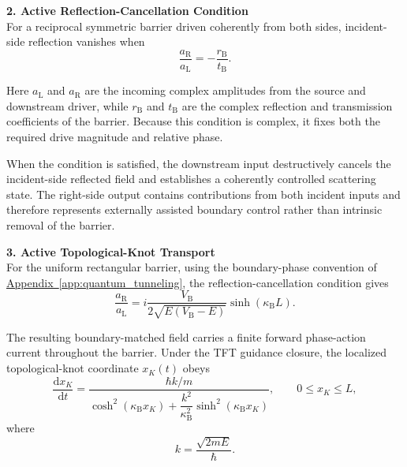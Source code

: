 \vspace{0.5em}
\noindent\textbf{2. Active Reflection-Cancellation Condition} \\

For a reciprocal symmetric barrier driven coherently from both sides, incident-side reflection vanishes when
\begin{equation}
    \frac{a_{\mathrm R}}{a_{\mathrm L}}
    =
    -\frac{r_{\mathrm B}}{t_{\mathrm B}}.
\end{equation}

Here $a_{\mathrm L}$ and $a_{\mathrm R}$ are the incoming complex amplitudes from the source and downstream driver, while $r_{\mathrm B}$ and $t_{\mathrm B}$ are the complex reflection and transmission coefficients of the barrier. Because this condition is complex, it fixes both the required drive magnitude and relative phase.

When the condition is satisfied, the downstream input destructively cancels the incident-side reflected field and establishes a coherently controlled scattering state. The right-side output contains contributions from both incident inputs and therefore represents externally assisted boundary control rather than intrinsic removal of the barrier.

\vspace{0.5em}
\noindent\textbf{3. Active Topological-Knot Transport} \\

For the uniform rectangular barrier, using the boundary-phase convention of
\hyperref[app:quantum_tunneling]{Appendix~\ref*{app:quantum_tunneling}}, the reflection-cancellation condition gives
\begin{equation}
    \frac{a_{\mathrm R}}{a_{\mathrm L}}
    =
    i
    \frac{
        V_{\mathrm B}
    }{
        2\sqrt{
            E(V_{\mathrm B}-E)
        }
    }
    \sinh\!\left(
        \kappa_{\mathrm B}L
    \right).
\end{equation}

The resulting boundary-matched field carries a finite forward phase-action current throughout the barrier. Under the TFT guidance closure, the localized topological-knot coordinate $x_K(t)$ obeys
\begin{equation}
    \frac{\mathrm dx_K}{\mathrm dt}
    =
    \frac{
        \hbar k/m
    }{
        \cosh^2(\kappa_{\mathrm B}x_K)
        +
        \dfrac{k^2}{\kappa_{\mathrm B}^{2}}
        \sinh^2(\kappa_{\mathrm B}x_K)
    },
    \qquad
    0\leq x_K\leq L,
\end{equation}
where
\begin{equation}
    k
    =
    \frac{\sqrt{2mE}}{\hbar}.
\end{equation}

